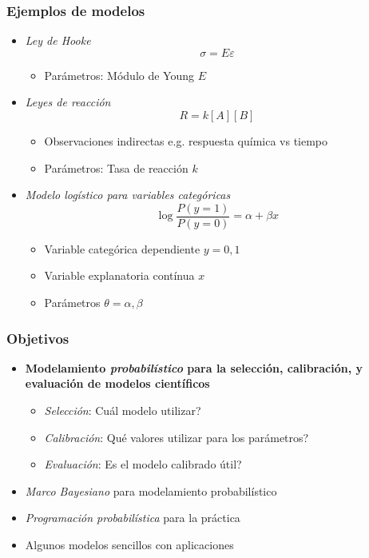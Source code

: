 \documentclass[xcolor=dvipsnames,10pt]{beamer}
\begin{document}
%
\begin{frame}
  \frametitle{Ejemplos de modelos}
  \begin{itemize}
  \item \emph{Ley de Hooke}
    \begin{equation*}
      \sigma = E \varepsilon
    \end{equation*}
    \vspace{-\baselineskip}
    \begin{itemize}
    \item Parámetros: Módulo de Young $E$
    \end{itemize}
    \pause
  \item \emph{Leyes de reacción}
    \begin{equation*}
      R = k [A] [B]
    \end{equation*}
    \vspace{-\baselineskip}
    \begin{itemize}
    \item Observaciones indirectas e.g. respuesta química vs tiempo
    \item Parámetros: Tasa de reacción $k$
    \end{itemize}
    \pause
  \item \emph{Modelo logístico para variables categóricas}
    \begin{equation*}
      \log \frac{P(y = 1)}{P(y = 0)} = \alpha + \beta x
    \end{equation*}
    \vspace{-\baselineskip}
    \begin{itemize}
    \item Variable categórica dependiente $y = {0, 1}$
    \item Variable explanatoria contínua $x$
    \item Parámetros $\theta = {\alpha, \beta}$
    \end{itemize}
  \end{itemize}
\end{frame}
%
\begin{frame}
  \frametitle{Objetivos}
  \begin{itemize}
  \item \textbf{Modelamiento \emph{probabilístico} para la selección, calibración, y evaluación de modelos científicos}
    \begin{itemize}
    \item \emph{Selección}: Cuál modelo utilizar?
    \item \emph{Calibración}: Qué valores utilizar para los parámetros?
    \item \emph{Evaluación}: Es el modelo calibrado útil?
    \end{itemize}
  \item \emph{Marco Bayesiano} para modelamiento probabilístico
  \item \emph{Programación probabilística} para la práctica
  \item Algunos modelos sencillos con aplicaciones
  \end{itemize}
\end{frame}
\end{document}
